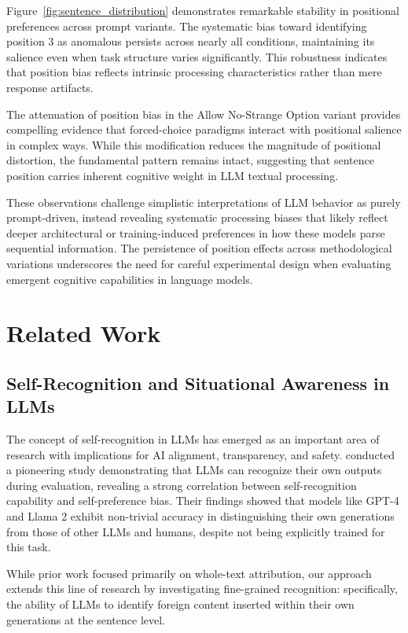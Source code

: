 \documentclass{article}
\begin{document}
Figure~\ref{fig:sentence_distribution} demonstrates remarkable stability in positional preferences across prompt variants. The systematic bias toward identifying position 3 as anomalous persists across nearly all conditions, maintaining its salience even when task structure varies significantly. This robustness indicates that position bias reflects intrinsic processing characteristics rather than mere response artifacts.

The attenuation of position bias in the Allow No-Strange Option variant provides compelling evidence that forced-choice paradigms interact with positional salience in complex ways. While this modification reduces the magnitude of positional distortion, the fundamental pattern remains intact, suggesting that sentence position carries inherent cognitive weight in LLM textual processing.

These observations challenge simplistic interpretations of LLM behavior as purely prompt-driven, instead revealing systematic processing biases that likely reflect deeper architectural or training-induced preferences in how these models parse sequential information. The persistence of position effects across methodological variations underscores the need for careful experimental design when evaluating emergent cognitive capabilities in language models.




\section{Related Work}

\subsection{Self-Recognition and Situational Awareness in LLMs}

The concept of self-recognition in LLMs has emerged as an important area of research with implications for AI alignment, transparency, and safety. \citet{panickssery2024llm} conducted a pioneering study demonstrating that LLMs can recognize their own outputs during evaluation, revealing a strong correlation between self-recognition capability and self-preference bias. Their findings showed that models like GPT-4 and Llama 2 exhibit non-trivial accuracy in distinguishing their own generations from those of other LLMs and humans, despite not being explicitly trained for this task.

While prior work focused primarily on whole-text attribution, our approach extends this line of research by investigating fine-grained recognition: specifically, the ability of LLMs to identify foreign content inserted within their own generations at the sentence level.
\end{document}

